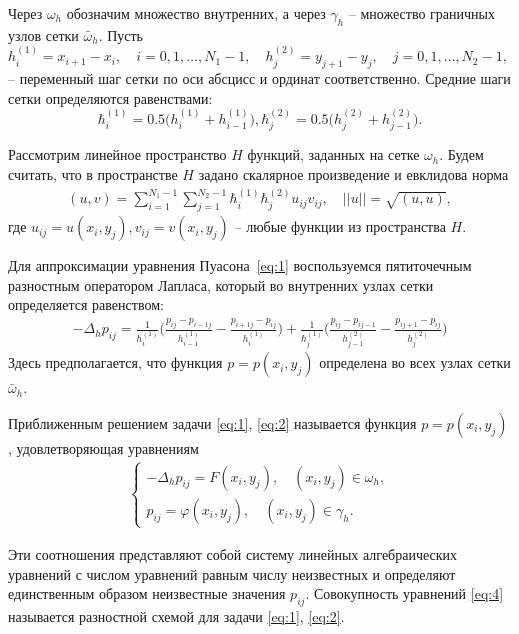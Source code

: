 \documentclass[12pt, a4paper]{article}
\begin{document}
            Через $\omega_h$ обозначим множество внутренних, а через $\gamma_h$ -- множество граничных узлов сетки $\bar\omega_h$. Пусть $h_i^{(1)} = x_{i + 1} - x_i, \quad i = 0, 1, \dots, N_1 - 1, \quad h_j^{(2)} = y_{j + 1} - y_j, \quad j = 0, 1, \dots, N_2 - 1, $ -- переменный шаг сетки по оси абсцисс и ординат соответственно. Средние шаги сетки определяются равенствами:
            $$\hbar_i^{(1)} = 0.5\big(h_i^{(1)} + h_{i-1}^{(1)}\big), \hbar_j^{(2)} = 0.5\big(h_j^{(2)} + h_{j-1}^{(2)}\big).$$

            Рассмотрим линейное пространство $H$ функций, заданных на сетке $\omega_h$. Будем считать, что в пространстве $H$ задано скалярное произведение и евклидова норма
            \begin{gather}
                (u, v) = \sum\limits_{i=1}^{N_1 - 1} \sum\limits_{j=1}^{N_2 - 1} \hbar_i^{(1)} \hbar_j^{(2)} u_{ij} v_{ij}, \quad ||u|| = \sqrt{(u,u)},
                \label{eq:3}
            \end{gather}
            где $u_{ij} = u(x_i, y_j), v_{ij} = v(x_i, y_j)$ -- любые функции из пространства $H$.

            Для аппроксимации уравнения Пуасона~\eqref{eq:1} воспользуемся пятиточечным разностным оператором Лапласа, который во внутренних узлах сетки определяется равенством:
            \begin{gather*}
                -\Delta_h p_{ij} = \frac{1}{\hbar_i^{(1)}} \Bigg(\frac{p_{ij} - p_{i-1 j}}{h_{i-1}^{(1)}} - \frac{p_{i+1 j} - p_{ij}}{h_i^{(1)}}\Bigg) +
                \frac{1}{\hbar_j^{(1)}} \Bigg(\frac{p_{ij} - p_{i j-1}}{h_{j-1}^{(2)}} - \frac{p_{i j+1} - p_{ij}}{h_j^{(2)}}\Bigg)
            \end{gather*}
            Здесь предполагается, что функция $p = p(x_i, y_j)$ определена во всех узлах сетки $\bar\omega_h$.

            Приближенным решением задачи \eqref{eq:1}, \eqref{eq:2} называется функция $p = p(x_i, y_j)$, удовлетворяющая уравнениям
            \begin{gather}
            \begin{cases}
                -\Delta_h p_{ij} = F(x_i, y_j), \quad (x_i, y_j) \in \omega_h,\\
                p_{ij} = \varphi(x_i, y_j), \quad (x_i, y_j) \in \gamma_h.
            \end{cases}
            \label{eq:4}
            \end{gather}

            Эти соотношения представляют собой систему линейных алгебраических уравнений с числом уравнений равным числу неизвестных и определяют единственным образом неизвестные значения $p_{ij}$. Совокупность уравнений \eqref{eq:4} называется разностной схемой для задачи \eqref{eq:1}, \eqref{eq:2}.
\end{document}
